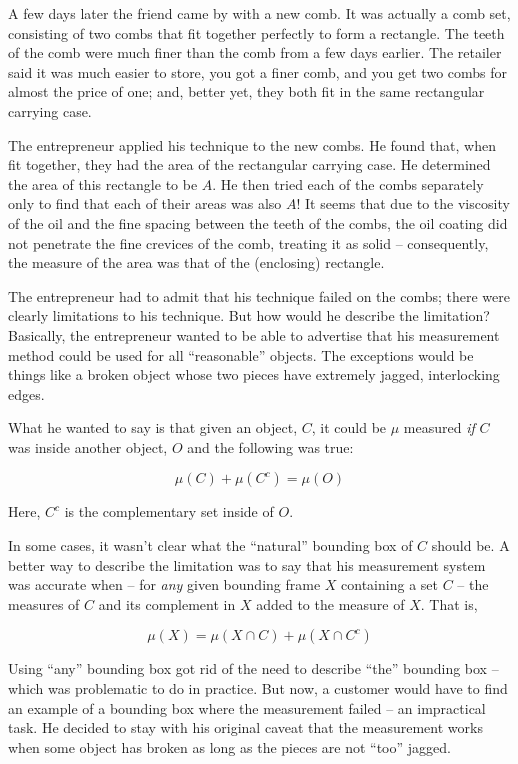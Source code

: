 \documentclass{article}
\begin{document}
A few days later the friend came by with a new comb. It was actually a comb 
set, consisting of two combs that fit together perfectly to form a rectangle.
The teeth of the comb were much finer than the comb from a few days earlier. 
The retailer said it was much easier to store, you got a finer comb, and you 
get two combs for almost the price of one; and, better yet, they both 
fit in the same rectangular carrying case.

The entrepreneur applied his technique to the new combs. 
He found that, when fit together, they had the area of the rectangular carrying case.
He determined the area of this rectangle to be $A$. He then tried each of the 
combs separately only to find that each of their areas was also $A$!
It seems that due to the viscosity of the oil and the fine spacing between the 
teeth of the combs, the oil coating did not penetrate the fine crevices of the
comb, treating it as solid -- consequently, the measure of the area was 
that of the (enclosing) rectangle.

The entrepreneur had to admit that his technique failed on the combs; 
there were clearly limitations to his technique. 
But how would he describe the limitation? Basically, the entrepreneur wanted to 
be able to advertise that his measurement method could be used for all 
``reasonable'' objects. The exceptions would be things like a broken object
whose two pieces have extremely jagged, interlocking edges.

What he wanted to say is that given an object, $C$, it could be $\mu$ measured 
{\em if\/} $C$ was inside another object, $O$ and the following was true:

\[
\mu(C) + \mu(C^c) = \mu(O)
\]

Here, $C^c$ is the complementary set inside of $O$.

In some cases, it wasn't clear what the ``natural'' bounding box of $C$ should be. A better way 
to describe the limitation was to say that his measurement system was accurate 
when -- for {\em any\/} given bounding frame $X$ containing a set $C$ -- 
the measures of $C$ and 
its complement in $X$ added to the measure of $X$. That is,

\[
\mu(X) = \mu(X \cap C) + \mu(X \cap C^c)
\]

Using ``any'' bounding box got rid of the need to describe ``the'' bounding box -- which
was problematic to do in practice.
But now, a customer would have to find an example of a bounding box where the 
measurement failed -- an impractical task.
He decided to stay with his original caveat that the measurement works when some object has 
broken as long as the pieces are not ``too'' jagged.
\end{document}

